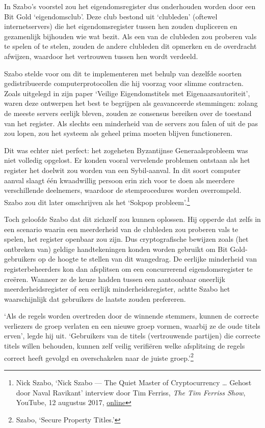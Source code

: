 \documentclass[
  a5paper,
  smalldemyvopaper,11pt,twoside,onecolumn,openright,extrafontsizes]{memoir}
\begin{document}
In Szabo's voorstel zou het eigendomsregister dus onderhouden worden
door een Bit Gold `eigendomsclub'. Deze club bestond uit `clubleden'
(oftewel internetservers) die het eigendomsregister tussen hen zouden
dupliceren en gezamenlijk bijhouden wie wat bezit. Als een van de
clubleden zou proberen vals te spelen of te stelen, zouden de andere
clubleden dit opmerken en de overdracht afwijzen, waardoor het
vertrouwen tussen hen wordt verdeeld.

Szabo stelde voor om dit te implementeren met behulp van dezelfde
soorten gedistribueerde computerprotocollen die hij voorzag voor slimme
contracten. Zoals uitgelegd in zijn paper `Veilige Eigendomstitels met
Eigenaarsautoriteit', waren deze ontwerpen het best te begrijpen als
geavanceerde stemmingen: zolang de meeste servers eerlijk bleven, zouden
ze consensus bereiken over de toestand van het register. Als slechts een
minderheid van de servers zou falen of uit de pas zou lopen, zou het
systeem als geheel prima moeten blijven functioneren.

Dit was echter niet perfect: het zogeheten Byzantijnse Generaalsprobleem
was niet volledig opgelost. Er konden vooral vervelende problemen
ontstaan als het register het doelwit zou worden van een Sybil-aanval.
In dit soort computer aanval slaagt één kwaadwillig persoon erin zich
voor te doen als meerdere verschillende deelnemers, waardoor de
stemprocedures worden overrompeld. Szabo zou dit later omschrijven als
het `Sokpop probleem'.\footnote{Nick Szabo, `Nick Szabo --- The Quiet
  Master of Cryptocurrency \ldots{} Gehost door Naval Ravikant'
  interview door Tim Ferriss, \emph{The Tim Ferriss Show}, YouTube, 12
  augustus 2017,
  \href{https://www.youtube.com/watch?v=3FA3UjA0igY}{online}}

Toch geloofde Szabo dat dit zichzelf zou kunnen oplossen. Hij opperde
dat zelfs in een scenario waarin een meerderheid van de clubleden zou
proberen vals te spelen, het register openbaar zou zijn. Dus
cryptografische bewijzen zoals (het ontbreken van) geldige
handtekeningen konden worden gebruikt om Bit Gold-gebruikers op de
hoogte te stellen van dit wangedrag. De eerlijke minderheid van
registerbeheerders kon dan afsplitsen om een concurrerend
eigendomsregister te creëren. Wanneer ze de keuze hadden tussen een
aantoonbaar oneerlijk meerderheidsregister of een eerlijk
minderheidsregister, achtte Szabo het waarschijnlijk dat gebruikers de
laatste zouden prefereren.

`Als de regels worden overtreden door de winnende stemmers, kunnen de
correcte verliezers de groep verlaten en een nieuwe groep vormen,
waarbij ze de oude titels erven', legde hij uit. `Gebruikers van de
titels (vertrouwende partijen) die correcte titels willen behouden,
kunnen zelf veilig verifiëren welke afsplitsing de regels correct heeft
gevolgd en overschakelen naar de juiste groep.'\footnote{Szabo, `Secure
  Property Titles.'}
\end{document}
